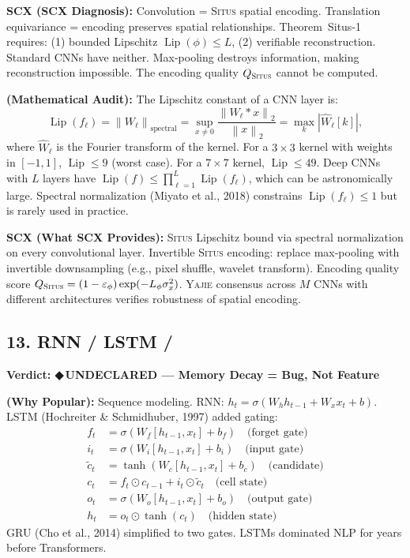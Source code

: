 \documentclass[12pt,a4paper]{article}
\theoremstyle{definition}
\newcommand{\guilty}{{\color{guiltycolor}\textbf{◆\,UNDECLARED}}}
\newcommand{\Situs}{\textsc{Situs}}
\newcommand{\Yajie}{\textsc{Yajie}}
\DeclareMathOperator{\Lip}{Lip}
\newcommand{\norm}[1]{\left\lVert#1\right\rVert}
\newcommand{\auditHeader}[1]{\medskip\noindent\textbf{\large #1}\medskip}
\newcommand{\whyPopular}{\noindent\textbf{ (Why Popular):} }
\newcommand{\whatMissing}{\noindent\textbf{SCX (What SCX Provides):} }
\newcommand{\diagnosis}{\noindent\textbf{SCX (SCX Diagnosis):} }
\newcommand{\mathAudit}{\noindent\textbf{ (Mathematical Audit):} }
\begin{document}
\diagnosis{} Convolution = \Situs{} spatial encoding. Translation equivariance = encoding preserves spatial relationships. Theorem~Situs-1 requires: (1) bounded Lipschitz $\Lip(\phi) \le L$, (2) verifiable reconstruction. Standard CNNs have neither. Max-pooling destroys information, making reconstruction impossible. The encoding quality $Q_{\Situs}$ cannot be computed.

\mathAudit{} The Lipschitz constant of a CNN layer is:
\[
\Lip(f_\ell) = \norm{W_\ell}_{\text{spectral}} = \sup_{x \neq 0} \frac{\norm{W_\ell * x}_2}{\norm{x}_2} = \max_k |\hat{W}_\ell[k]|,
\]
where $\hat{W}_\ell$ is the Fourier transform of the kernel. For a $3 \times 3$ kernel with weights in $[-1, 1]$, $\Lip \le 9$ (worst case). For a $7 \times 7$ kernel, $\Lip \le 49$. Deep CNNs with $L$ layers have $\Lip(f) \le \prod_{\ell=1}^L \Lip(f_\ell)$, which can be astronomically large. Spectral normalization (Miyato et al., 2018) constrains $\Lip(f_\ell) \le 1$ but is rarely used in practice.

\whatMissing{} \Situs{} Lipschitz bound via spectral normalization on every convolutional layer. Invertible \Situs{} encoding: replace max-pooling with invertible downsampling (e.g., pixel shuffle, wavelet transform). Encoding quality score $Q_{\Situs} = (1-\varepsilon_\phi)\exp(-L_\phi\sigma_x^2)$. \Yajie{} consensus across $M$ CNNs with different architectures verifies robustness of spatial encoding.

\subsection{13. RNN / LSTM /}

\auditHeader{Verdict: \guilty{} — Memory Decay = Bug, Not Feature}

\whyPopular{} Sequence modeling. RNN: $h_t = \sigma(W_h h_{t-1} + W_x x_t + b)$. LSTM (Hochreiter \& Schmidhuber, 1997) added gating:
\begin{align}
    f_t &= \sigma(W_f[h_{t-1}, x_t] + b_f) \quad \text{(forget gate)} \\
    i_t &= \sigma(W_i[h_{t-1}, x_t] + b_i) \quad \text{(input gate)} \\
    \tilde{c}_t &= \tanh(W_c[h_{t-1}, x_t] + b_c) \quad \text{(candidate)} \\
    c_t &= f_t \odot c_{t-1} + i_t \odot \tilde{c}_t \quad \text{(cell state)} \\
    o_t &= \sigma(W_o[h_{t-1}, x_t] + b_o) \quad \text{(output gate)} \\
    h_t &= o_t \odot \tanh(c_t) \quad \text{(hidden state)}
\end{align}
GRU (Cho et al., 2014) simplified to two gates. LSTMs dominated NLP for years before Transformers.
\end{document}
